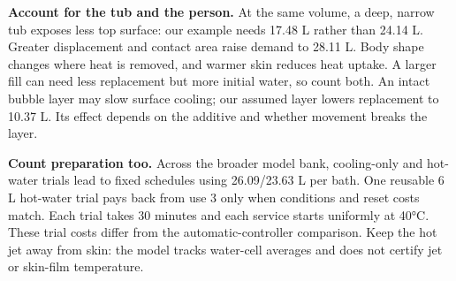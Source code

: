 \documentclass[12pt,a4paper]{article}
\begin{document}
\textbf{Account for the tub and the person.} At the same volume, a deep, narrow tub exposes less top surface: our example needs 17.48 L rather than 24.14 L. Greater displacement and contact area raise demand to 28.11 L. Body shape changes where heat is removed, and warmer skin reduces heat uptake. A larger fill can need less replacement but more initial water, so count both. An intact bubble layer may slow surface cooling; our assumed layer lowers replacement to 10.37 L. Its effect depends on the additive and whether movement breaks the layer.

\textbf{Count preparation too.} Across the broader model bank, cooling-only and hot-water trials lead to fixed schedules using 26.09/23.63 L per bath. One reusable 6 L hot-water trial pays back from use 3 only when conditions and reset costs match. Each trial takes 30 minutes and each service starts uniformly at 40°C. These trial costs differ from the automatic-controller comparison. Keep the hot jet away from skin: the model tracks water-cell averages and does not certify jet or skin-film temperature.

\clearpage
\end{document}
